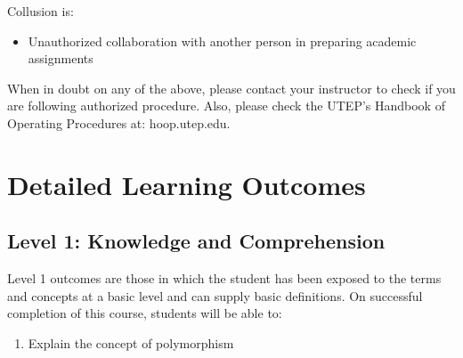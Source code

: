 \documentclass[12pt]{scrartcl}
\begin{document}
Collusion is:
\begin{itemize}
\item Unauthorized collaboration with another person in preparing academic assignments
\end{itemize}

\begin{tcolorbox}[colback=red!5,colframe=red!75!black,title=Important!]
When in doubt on any of the above, please contact your instructor to check if you are following authorized procedure. Also, please check the UTEP’s Handbook of Operating Procedures at: hoop.utep.edu. 
\end{tcolorbox}

\section{Detailed Learning Outcomes}

\subsection*{Level 1: Knowledge and Comprehension}
Level 1 outcomes are those in which the student has been exposed to the terms and concepts at a basic level and can supply basic definitions. On successful completion of this course, students will be able to:
\begin{enumerate}
   \item Explain the concept of polymorphism
\end{enumerate}
\end{document}
